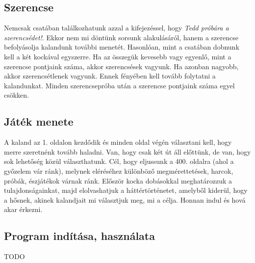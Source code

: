 \documentclass{article}
\begin{document}
      \subsection{Szerencse}
        Nemcsak csatában találkozhatunk azzal a kifejezéssel, hogy
        \emph{Tedd próbára a szerencsédet!}. Ekkor nem mi döntünk sorsunk
        alakulásáról, hanem a szerencse befolyásolja kalandunk további
        menetét. Hasonlóan, mint a csatában dobnunk kell a két kockával
        egyszerre. Ha az összegük kevesebb vagy egyenlő, mint a szerencse
        pontjaink száma, akkor szerencsések vagyunk. Ha azonban nagyobb, akkor
        szerencsétlenek vagyunk. Ennek fényében kell tovább folytatni a
        kalandunkat. Minden szerencsepróba után a szerencse pontjaink száma
        egyel csökken.
    
      \subsection{Játék menete}
        A kaland az 1. oldalon kezdődik és minden oldal végén választani kell,
        hogy merre szeretnénk tovább haladni. Van, hogy csak két út áll
        előttünk, de van, hogy sok lehetőség közül választhatunk. Cél, hogy
        eljussunk a 400. oldalra (ahol a győzelem vár ránk), melynek eléréséhez
        különböző megmérettetések, harcok, próbák, észjátékok várnak ránk.
        Először kocka dobásokkal meghatározzuk a tulajdonságainkat, majd
        elolvashatjuk a háttértörténetet, amelyből kiderül, hogy a hősnek,
        akinek kalandjait mi választjuk meg, mi a célja. Honnan indul és
        hová akar érkezni.
    \subsection{Program indítása, használata}
      TODO
\end{document}
